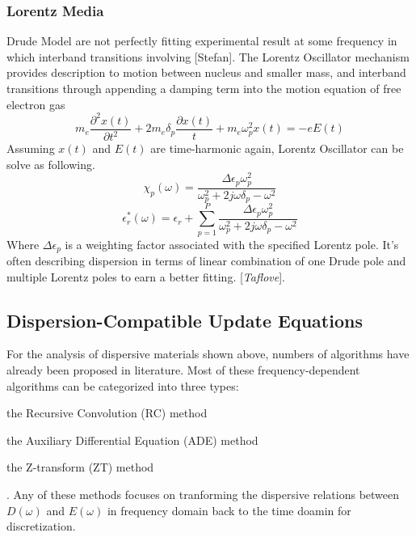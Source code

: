 \subsubsection{Lorentz Media}
Drude Model are not perfectly fitting experimental result at some frequency in which interband transitions involving
[Stefan]. The Lorentz Oscillator mechanism provides description to motion between nucleus and smaller mass, and
interband transitions through appending a damping term into the motion equation of free electron gas
\begin{equation}
    m_e\frac{\partial^2 x(t)}{\partial t^2} + 2m_e\delta_p\frac{\partial x(t)}{t} + m_e\omega_p^2x(t) = -eE(t)
\end{equation}
Assuming $x(t)$ and $E(t)$ are time-harmonic again, Lorentz Oscillator can be solve as following. 
\begin{equation}
  \label{eq:lorentz_chi}
  \chi_p(\omega) = \frac{\Delta\epsilon_p\omega_p^2}{\omega_p^2 + 2j\omega\delta_p - \omega^2}  
\end{equation}
\begin{equation}
  \epsilon_r^*(\omega) = \epsilon_r + \sum_{p=1}^P \frac{\Delta\epsilon_p\omega_p^2}{\omega_p^2 + 2j\omega\delta_p - \omega^2}  
\end{equation}
Where $\Delta\epsilon_p$ is a weighting factor associated with the specified Lorentz pole. It's often describing
dispersion in terms of linear combination of one Drude pole and multiple Lorentz poles to earn a better fitting.
[\textit{Taflove}].



\subsection{Dispersion-Compatible Update Equations}
For the analysis of dispersive materials shown above, numbers of algorithms have already been proposed in literature.
Most of these frequency-dependent algorithms can be categorized into three types:\begin{inparaenum}[(1)]
\item the Recursive Convolution (RC) method
\item the Auxiliary Differential Equation (ADE) method
\item the Z-transform (ZT) method\end{inparaenum}.
Any of these methods focuses on tranforming the dispersive relations between $D(\omega)$ and $E(\omega)$ in frequency
domain back to the time doamin for discretization.


